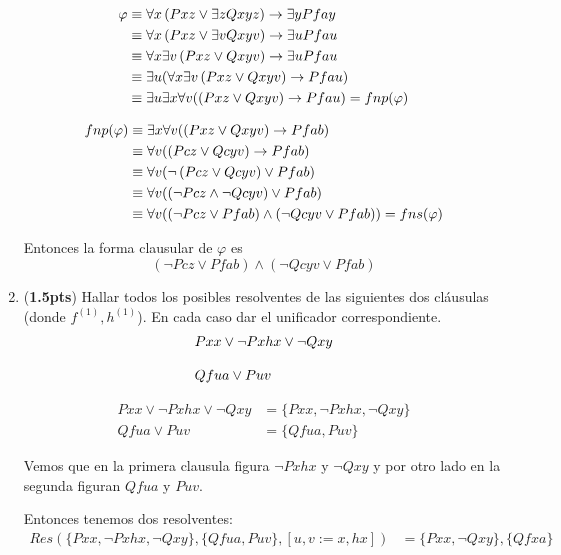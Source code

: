 \documentclass[11pt,letterpaper]{article}
\begin{document}
\begin{enumerate}
  \begin{align*}
    \varphi &\equiv
    \fa x \left( Pxz \lor \ex z Qxyz\right) \rightarrow \ex y Pfay\\
    &\equiv
    \fa x \left( Pxz \lor \ex v Qxyv\right) \rightarrow \ex u Pfau\\
    &\equiv
    \fa x \ex v \left( Pxz \lor Qxyv\right) \rightarrow \ex u Pfau\\
    &\equiv
    \ex u (\fa x \ex v \left( Pxz \lor Qxyv\right) \rightarrow Pfau)\\
    &\equiv
    \ex u \ex x \fa v (\left( Pxz \lor Qxyv\right) \rightarrow Pfau) = fnp(\varphi)
  \end{align*}

  \begin{align*}
    fnp(\varphi) &\equiv
    \ex x \fa v (\left( Pxz \lor Qxyv\right) \rightarrow Pfab) \\
    &\equiv
    \fa v (\left( Pcz \lor Qcyv\right) \rightarrow Pfab) \\
    &\equiv
    \fa v (\neg \left( Pcz \lor Qcyv\right) \lor Pfab) \\
    &\equiv
    \fa v (\left(\neg Pcz \land \neg Qcyv\right) \lor Pfab) \\
    &\equiv
    \fa v (\left(\neg Pcz \lor Pfab\right)\land\left(\neg Qcyv\lor Pfab)\right) = fns(\varphi)
  \end{align*}

  Entonces la forma clausular de $\varphi$ es
  $$\left(\neg Pcz \lor Pfab\right)\land\left(\neg Qcyv\lor Pfab\right)$$
  \ee
  \newpage
\item (\textbf{1.5pts}) 
Hallar todos los posibles resolventes de las siguientes dos cláusulas (donde 
$f^{(1)},h^{(1)}$). En cada caso dar el unificador correspondiente.
\[
\ba{l}
Pxx \lor \neg Pxhx \lor \neg Qxy \\ \\
Qfua \lor Puv
\ea
\]

\begin{align*}
  Pxx \lor \neg Pxhx \lor \neg Qxy &= \{Pxx, \neg Pxhx,\neg Qxy\}\\
  Qfua \lor Puv &= \{Qfua, Puv\}
\end{align*}

Vemos que en la primera clausula figura $\neg Pxhx$ y $\neg Qxy$
y por otro lado en la segunda figuran $Qfua$ y $Puv$.

Entonces tenemos dos resolventes:
\begin{align*}
  Res(\{Pxx, \neg Pxhx,\neg Qxy\}, \{Qfua, Puv\}, [u, v:= x, hx]) &= \{Pxx, \neg Qxy\}, \{Qfxa\}
\end{align*}


\end{enumerate}
\end{document}
